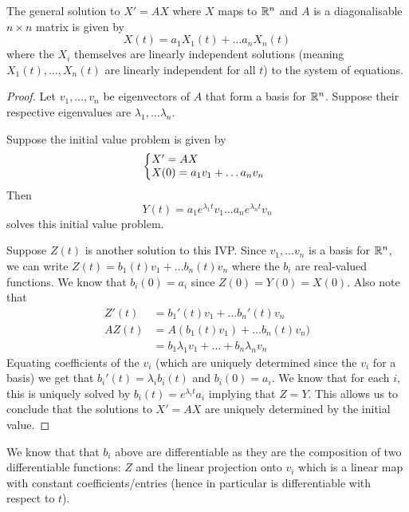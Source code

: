 \begin{lemma}
The general solution to $X' = AX$ where $X$ maps to $\mathbb{R}^n$ and $A$ is a diagonalisable $n \times n$ matrix is given by 
$$ X(t) = a_1 X_1(t) + \dots a_n X_n(t) $$
where the $X_i$ themselves are linearly independent solutions (meaning $X_1(t), \dots, X_n(t)$ are linearly independent for all $t$) to the system of equations.
\end{lemma}
\begin{proof}
Let $v_1, \dots, v_n$ be eigenvectors of $A$ that form a basis for $\mathbb{R}^n$. Suppose their respective eigenvalues are $\lambda_1, \dots \lambda_n$.

Suppose the initial value problem is given by
\begin{equation}
  \left\{
  \begin{array}{@{}ll@{}}
    X' = AX \\
    X(0) = a_1 v_1 + \dots a_n v_n
  \end{array}\right.
\end{equation}
Then
$$ Y(t) = a_1 e^{\lambda_1 t}v_1 \dots a_n e^{\lambda_n t} v_n $$
solves this initial value problem.

Suppose $Z(t)$ is another solution to this IVP. Since $v_1, \dots v_n$ is a basis for $\mathbb{R}^n$, we can write $Z(t) = b_1(t) v_1 + \dots b_n(t) v_n$ where the $b_i$ are real-valued functions. We know that $b_i(0) = a_i$ since $Z(0) = Y(0) = X(0)$. Also note that
\begin{align*}
    Z'(t) &= b_1'(t) v_1 + \dots b_n'(t) v_n\\
    AZ(t) &= A(b_1(t) v_1) + \dots b_n(t) v_n)\\
    &= b_1 \lambda_1 v_1 + \dots + b_n \lambda_n v_n
\end{align*}
Equating coefficients of the $v_i$ (which are uniquely determined since the $v_i$ for a basis) we get that $b_i'(t) = \lambda_i b_i(t)$ and $b_i(0) = a_i$. We know that for each $i$, this is uniquely solved by $b_i(t) = e^{\lambda_i t} a_i$ implying that $Z = Y$. This allows us to conclude that the solutions to $X' = AX$ are uniquely determined by the initial value.
\end{proof}
\begin{remark}
We know that that $b_i$ above are differentiable as they are the composition of two differentiable functions: $Z$ and the linear projection onto $v_i$ which is a linear map with constant coefficients/entries (hence in particular is differentiable with respect to $t$).
\end{remark}

